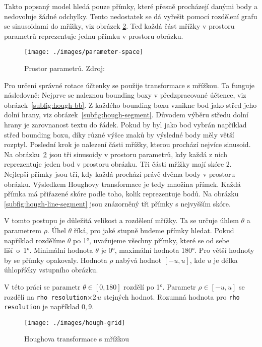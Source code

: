 \documentclass[thesis=B,czech]{FITthesis}[2019/12/23]
\def\myit#1{\texttt{#1}}
\begin{document}
Takto popsaný model hledá pouze přímky, které přesně procházejí danými body a nedovoluje žádné odchylky. Tento nedostatek se dá vyřešit pomocí rozdělení grafu se sinusoidami do mřížky, viz obrázek \ref{fig:hough-grid}. Teď každá část mřížky v prostoru parametrů reprezentuje jednu přímku v prostoru obrázku.

\begin{figure}[b]%
	\centering
	\texttt{[image: ./images/parameter-space]}
	\caption[Prostor parametrů]{Prostor parametrů. Zdroj:  \cite[Fig. 1, překresleno]{Duda1972}}%
	\label{fig:parameter-space}
\end{figure}

\newpage
Pro určení správné rotace účtenky se použije transformace s mřížkou. Ta funguje následovně: Nejprve se naleznou bounding boxy v předzpracované účtence, viz obrázek~\ref{subfig:hough-bb}. Z každého bounding boxu vznikne bod jako střed jeho dolní hrany, viz obrázek~\ref{subfig:hough-segment}. Důvodem výběru středu dolní hrany je zarovnanost textu do řádek. Pokud by byl jako bod vybrán například střed bounding boxu, díky různé výšce znaků by výsledné body měly větší rozptyl. Poslední krok je nalezení části mřížky, kterou prochází nejvíce sinusoid. Na obrázku~\ref{fig:hough-grid} jsou tři sinusoidy v prostoru parametrů, kdy každá z nich reprezentuje jeden bod v prostoru obrázku. Tři části mřížky mají skóre 2. Nejlepší přímky jsou tři, kdy každá prochází právě dvěma body v prostoru obrázku. Výsledkem Houghovy transformace je tedy množina přímek. Každá přímka má přiřazené skóre podle toho, kolik reprezentuje bodů. Na obrázku \ref{subfig:hough-line-segment} jsou znázorněný tři přímky s nejvyšším skóre.

V tomto postupu je důležitá velikost a rozdělení mřížky. Ta se určuje úhlem $\theta$ a   parametrem $\rho$. Úhel $\theta$ říká, pro jaké stupně budeme přímky hledat. Pokud například rozdělíme $\theta$ po 1°, uvažujeme všechny přímky, které se od sebe liší~o~1°. Minimální hodnota $\theta$ je 0°, maximální hodnota 180°. Pro větší hodnoty by se přímky opakovaly. Hodnota $\rho$ nabývá hodnot $[-u, u]$, kde $u$ je délka úhlopříčky vstupního obrázku.

V této práci se parametr $\theta\in[0, 180]$ rozdělí po 1°. Parametr $\rho\in[-u,u]$ se rozdělí na \myit{rho resolution}$\times 2\,u$ stejných hodnot. Rozumná hodnota pro \myit{rho resolution} je například $0,9$.


\begin{figure}[]%
	\centering
	\texttt{[image: ./images/hough-grid]}
	\caption{Houghova transformace s mřížkou}\label{fig:hough-grid}
\end{figure}
\end{document}
